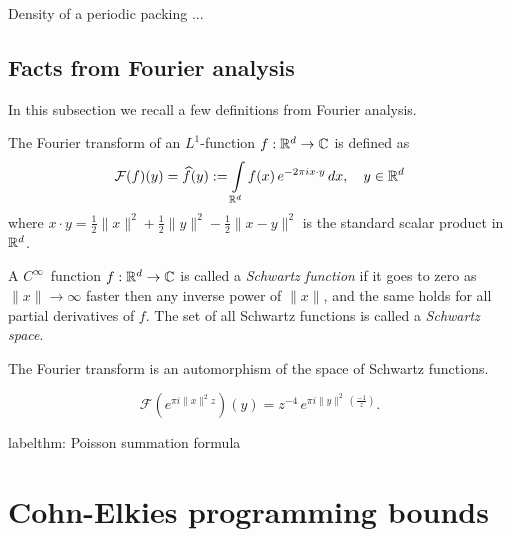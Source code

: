   \begin{lemma} Density of a periodic packing ...
  \end{lemma}
  \subsection{Facts from Fourier analysis}

  In this subsection we recall a few definitions from Fourier analysis.
  \begin{definition}\label{def: Fourier Transform definition}
  The Fourier transform of an $L^1$-function $f:\mathbb{R}^d\to\mathbb{C}$ is defined as
  $$\mathcal{F}(f)(y)=\widehat{f}(y):=\int\limits_{\mathbb{R}^d} f(x)\,e^{-2\pi i x\cdot y}\,dx,\quad y\in\mathbb{R}^d $$
  where $x\cdot y=\frac12\|x\|^2+\frac12\|y\|^2-\frac12\|x-y\|^2$ is the standard scalar product in $\mathbb{R}^d$.
  \end{definition}
  \begin{definition}
  A $C^\infty$~function $f:\mathbb{R}^d\to\mathbb{C}$ is called a \emph{Schwartz function} if it goes to zero as $\|x\|\to\infty$ faster then any inverse power of $\|x\|$, and the same holds for all partial derivatives of $f$. The set of all Schwartz functions is called a \emph{Schwartz space}.
  \end{definition}
  \begin{lemma}The Fourier transform is an automorphism of the space of Schwartz functions.\end{lemma}
  \begin{lemma}\label{lemma: Gaussian Fourier}
  \begin{equation}\mathcal{F}(e^{\pi i  \|x\|^2 z})(y)=z^{-4}\,e^{\pi i \|y\|^2 \,(\frac{-1}{z}) }.\end{equation}
  \end{lemma}
  \begin{theorem}label{thm: Poisson summation formula}
  \end{theorem}

  \section{Cohn-Elkies programming bounds}

